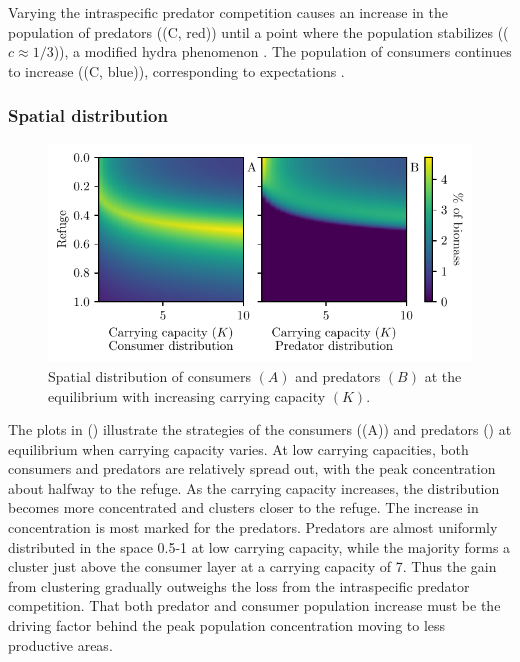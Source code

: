 Varying the intraspecific predator competition causes an increase in the population of predators ((C, red)) until a point where the population stabilizes (($c\approx 1/3$)), a modified hydra phenomenon \citep{abrams2009does}. The population of consumers continues to increase ((C, blue)), corresponding to expectations \citep{abrams1992predators}.


\subsubsection{Spatial distribution}
\begin{figure}[H]
  \caption{Spatial distribution of consumers $(A)$ and predators $(B)$ at the equilibrium with increasing carrying capacity $(K)$.}
  \label{fig:strat_car}
  \includegraphics{plots/increasing_car_cap_c.pdf}
\end{figure}
The plots in () illustrate the strategies of the consumers ((A)) and predators () at equilibrium when carrying capacity varies. At low carrying capacities, both consumers and predators are relatively spread out, with the peak concentration about halfway to the refuge. As the carrying capacity increases, the distribution becomes more concentrated and clusters closer to the refuge. The increase in concentration is most marked for the predators. Predators are almost uniformly distributed in the space 0.5-1 at low carrying capacity, while the majority forms a cluster just above the consumer layer at a carrying capacity of 7. Thus the gain from clustering gradually outweighs the loss from the intraspecific predator competition. That both predator and consumer population increase must be the driving factor behind the peak population concentration moving to less productive areas.

